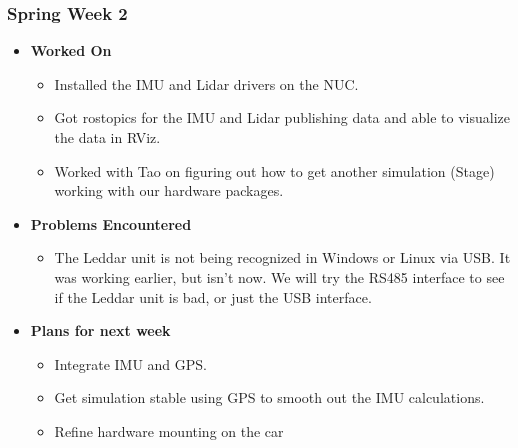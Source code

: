 \documentclass[compsoc,draftclsnofoot,onecolumn,10pt]{IEEEtran}
\begin{document}
\subsubsection{Spring Week 2}
\begin{itemize}
    \item {\textbf{Worked On}}
    \begin{itemize}
        \item Installed the IMU and Lidar drivers on the NUC.
        \item Got rostopics for the IMU and Lidar publishing data and able to visualize the data in RViz.
        \item Worked with Tao on figuring out how to get another simulation (Stage) working with our hardware packages.
    \end{itemize}

    \item {\textbf{Problems Encountered}}
    \begin{itemize}
        \item The Leddar unit is not being recognized in Windows or Linux via USB. It was working earlier, but isn't now. We will try the RS485 interface to see if the Leddar unit is bad, or just the USB interface.
    \end{itemize}

    \item{\textbf{Plans for next week}}
    \begin{itemize}
        \item Integrate IMU and GPS.
        \item Get simulation stable using GPS to smooth out the IMU calculations.
        \item Refine hardware mounting on the car
    \end{itemize}
\end{itemize}
\end{document}
